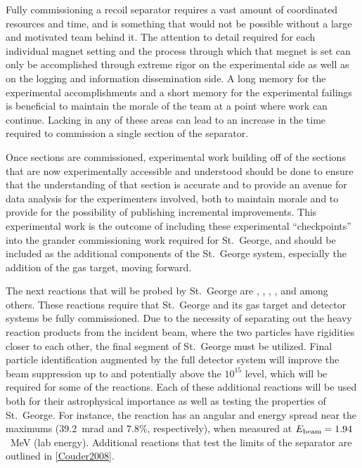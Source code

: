Fully commissioning a recoil separator requires a vast amount of
coordinated resources and time, and is something that would not be
possible without a large and motivated team behind it. The attention to
detail required for each individual magnet setting and the process
through which that megnet is set can only be accomplished through
extreme rigor on the experimental side as well as on the logging and
information dissemination side. A long memory for the experimental
accomplishments and a short memory for the experimental failings is
beneficial to maintain the morale of the team at a point where work can
continue. Lacking in any of these areas can lead to an increase in the
time required to commission a single section of the separator.

Once sections are commissioned, experimental work building off of the
sections that are now experimentally accessible and understood should be
done to ensure that the understanding of that section is accurate and to
provide an avenue for data analysis for the experimenters involved, both
to maintain morale and to provide for the possibility of publishing
incremental improvements. This experimental work is the outcome of
including these experimental ``checkpoints'' into the grander
commissioning work required for St.\ George, and should be included as
the additional components of the St.\ George system, especially the
addition of the gas target, moving forward.

The next reactions that will be probed by St.\ George are
,
,
,
, and
 among others. These
reactions require that St.\ George and its gas target and detector
systems be fully commissioned. Due to the necessity of separating out
the heavy reaction products from the incident beam, where the two
particles have rigidities closer to each other, the final segment of
St.\ George must be utilized. Final particle identification augmented by
the full detector system will improve the beam suppression up to and
potentially above the $10^{15}$ level, which will be required for some
of the reactions. Each of these additional reactions will be used both
for their astrophysical importance as well as testing the properties of
St.\ George. For instance, the reaction
 has an angular and
energy spread near the maximums (39.2~mrad and 7.8\%, respectively),
when measured at $E_{\rm beam} = 1.94$~MeV (lab energy). Additional
reactions that test the limits of the separator are outlined in
\ref{Couder2008}.

